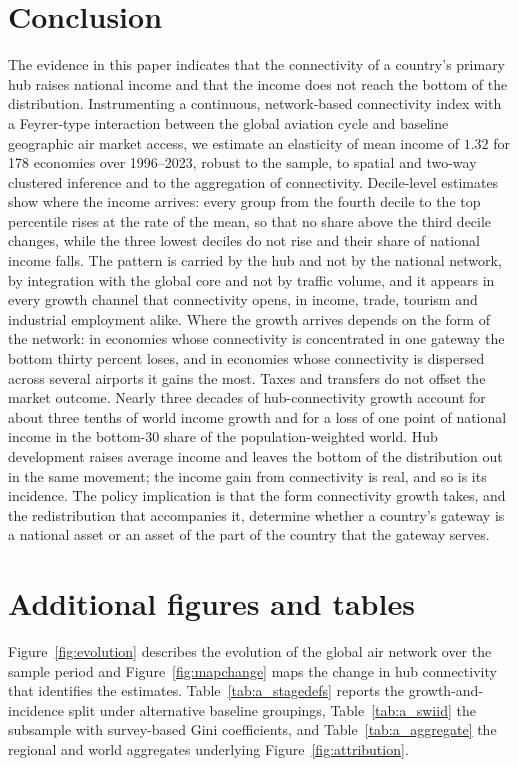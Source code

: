 \section{Conclusion}
\label{sec:conclusion}
The evidence in this paper indicates that the connectivity of a country's primary hub raises national income and that the income does not reach the bottom of the distribution. Instrumenting a continuous, network-based connectivity index with a Feyrer-type interaction between the global aviation cycle and baseline geographic air market access, we estimate an elasticity of mean income of $1.32$ for 178 economies over 1996--2023, robust to the sample, to spatial and two-way clustered inference and to the aggregation of connectivity. Decile-level estimates show where the income arrives: every group from the fourth decile to the top percentile rises at the rate of the mean, so that no share above the third decile changes, while the three lowest deciles do not rise and their share of national income falls. The pattern is carried by the hub and not by the national network, by integration with the global core and not by traffic volume, and it appears in every growth channel that connectivity opens, in income, trade, tourism and industrial employment alike. Where the growth arrives depends on the form of the network: in economies whose connectivity is concentrated in one gateway the bottom thirty percent loses, and in economies whose connectivity is dispersed across several airports it gains the most. Taxes and transfers do not offset the market outcome. Nearly three decades of hub-connectivity growth account for about three tenths of world income growth and for a loss of one point of national income in the bottom-30 share of the population-weighted world. Hub development raises average income and leaves the bottom of the distribution out in the same movement; the income gain from connectivity is real, and so is its incidence. The policy implication is that the form connectivity growth takes, and the redistribution that accompanies it, determine whether a country's gateway is a national asset or an asset of the part of the country that the gateway serves.

\appendix
\section{Additional figures and tables}
\label{sec:appendix}
Figure~\ref{fig:evolution} describes the evolution of the global air network over the sample period and Figure~\ref{fig:mapchange} maps the change in hub connectivity that identifies the estimates. Table~\ref{tab:a_stagedefs} reports the growth-and-incidence split under alternative baseline groupings, Table~\ref{tab:a_swiid} the subsample with survey-based Gini coefficients, and Table~\ref{tab:a_aggregate} the regional and world aggregates underlying Figure~\ref{fig:attribution}.


